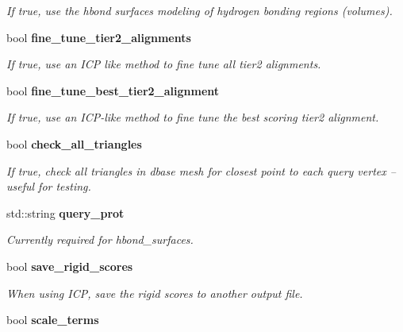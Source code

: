 \begin{CompactItemize}
\begin{CompactList}\small\item\em If true, use the hbond surfaces modeling of hydrogen bonding regions (volumes). \item\end{CompactList}\item 
bool \bf{fine\_\-tune\_\-tier2\_\-alignments}\label{classASCbase_1_1SearchParameters_7e249d3358f464048cca7f574052e844}

\begin{CompactList}\small\item\em If true, use an ICP like method to fine tune all tier2 alignments. \item\end{CompactList}\item 
bool \bf{fine\_\-tune\_\-best\_\-tier2\_\-alignment}\label{classASCbase_1_1SearchParameters_6c449d3293b369f0c71e875e14d2039a}

\begin{CompactList}\small\item\em If true, use an ICP-like method to fine tune the best scoring tier2 alignment. \item\end{CompactList}\item 
bool \bf{check\_\-all\_\-triangles}\label{classASCbase_1_1SearchParameters_44592b748c47ab06a54c680635dc0795}

\begin{CompactList}\small\item\em If true, check all triangles in dbase mesh for closest point to each query vertex -- useful for testing. \item\end{CompactList}\item 
std::string \bf{query\_\-prot}\label{classASCbase_1_1SearchParameters_600f1a2e9136a1c54dc751c3bc6f3665}

\begin{CompactList}\small\item\em Currently required for hbond\_\-surfaces. \item\end{CompactList}\item 
bool \bf{save\_\-rigid\_\-scores}\label{classASCbase_1_1SearchParameters_bc80a6f5d0264c5f4b5ca582c1183a14}

\begin{CompactList}\small\item\em When using ICP, save the rigid scores to another output file. \item\end{CompactList}\item 
bool \bf{scale\_\-terms}\label{classASCbase_1_1SearchParameters_dcb623f26a6aabaf855021f954cee078}


\end{CompactItemize}

